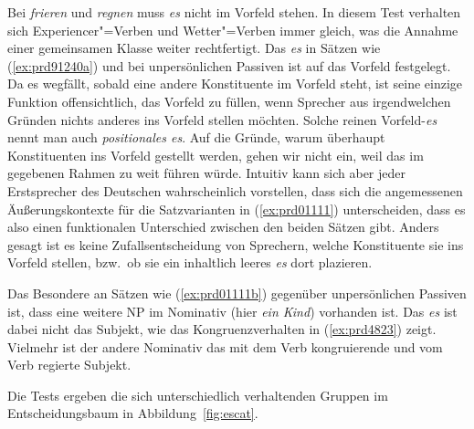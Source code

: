 Bei \textit{frieren} und \textit{regnen} muss \textit{es} nicht im Vorfeld stehen.
In diesem Test verhalten sich Experiencer"=Verben und Wetter"=Verben immer gleich, was die Annahme einer gemeinsamen Klasse weiter rechtfertigt.
Das \textit{es} in Sätzen wie (\ref{ex:prd91240a}) und bei unpersönlichen Passiven ist auf das Vorfeld festgelegt.
Da es wegfällt, sobald eine andere Konstituente im Vorfeld steht, ist seine einzige Funktion offensichtlich, das Vorfeld zu füllen, wenn Sprecher aus irgendwelchen Gründen nichts anderes ins Vorfeld stellen möchten.
Solche reinen Vorfeld-\textit{es} nennt man auch \textit{positionales es}.
Auf die Gründe, warum überhaupt Konstituenten ins Vorfeld gestellt werden, gehen wir nicht ein, weil das im gegebenen Rahmen zu weit führen würde.
Intuitiv kann sich aber jeder Erstsprecher des Deutschen wahrscheinlich vorstellen, dass sich die angemessenen Äußerungskontexte für die Satzvarianten in (\ref{ex:prd01111}) unterscheiden, dass es also einen funktionalen Unterschied zwischen den beiden Sätzen gibt.
Anders gesagt ist es keine Zufallsentscheidung von Sprechern, welche Konstituente sie ins Vorfeld stellen, bzw.\ ob sie ein inhaltlich leeres \textit{es} dort plazieren.

\begin{exe}
  \ex\label{ex:prd01111} 
  \begin{xlist}
  \end{xlist}
\end{exe}

Das Besondere an Sätzen wie (\ref{ex:prd01111b}) gegenüber unpersönlichen Passiven ist, dass eine weitere NP im Nominativ (hier \textit{ein Kind}) vorhanden ist.
Das \textit{es} ist dabei nicht das Subjekt, wie das Kongruenzverhalten in (\ref{ex:prd4823}) zeigt.
Vielmehr ist der andere Nominativ das mit dem Verb kongruierende und vom Verb regierte Subjekt.

\begin{exe}
  \ex\label{ex:prd4823}
  \begin{xlist}
  \end{xlist}
\end{exe}

Die Tests ergeben die sich unterschiedlich verhaltenden Gruppen im Entscheidungsbaum in Abbildung~\ref{fig:escat}.

